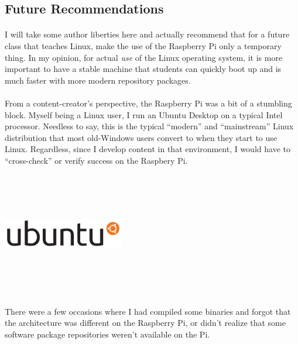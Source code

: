\documentclass[11pt]{article}
\begin{document}
	\subsection{Future Recommendations}

	\paragraph{} I will take some author liberties here and actually recommend that for a future class that teaches Linux, make the use of the Raspberry Pi only a temporary thing. In my opinion, for actual \textit{use} of the Linux operating system, it is more important to have a stable machine that students can quickly boot up and is much faster with more modern repository packages. 

	\paragraph{} From a content-creator's perspective, the Raspberry Pi was a bit of a stumbling block. Myself being a Linux user, I run an Ubuntu Desktop on a typical Intel processor. Needless to say, this is the typical ``modern'' and ``mainstream'' Linux distribution that most old-Windows users convert to when they start to use Linux. Regardless, since I develop content in that environment, I would have to ``cross-check'' or verify success on the Raspbery Pi.  


	\begin{center}
		\graphicspath{ {.} }
		\includegraphics[width=200px,height=200px,keepaspectratio]{ubuntu_logo.png}
		\centering
	\end{center}

	\paragraph{} There were a few occasions where I had compiled some binaries and forgot that the architecture was different on the Raspberry Pi, or didn't realize that some software package repositories weren't available on the Pi.
\end{document}
